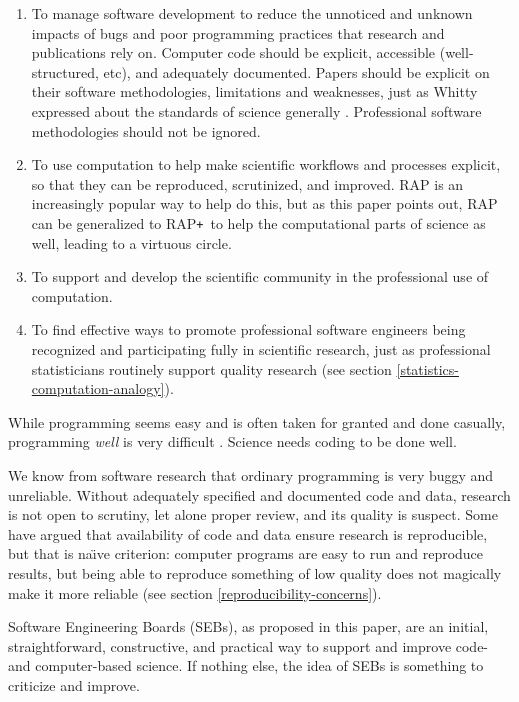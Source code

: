 \documentclass{comjnl}
\def\RAPstar{RAP{\tt +}}
\begin{document}
\begin{enumerate}\raggedright
\itemsep=1.5ex

\item 
To manage software development to reduce the unnoticed and unknown impacts of bugs and poor programming practices that research and publications rely on. Computer code should be explicit, accessible (well-structured, etc), and adequately documented. Papers should be explicit on their software methodologies, limitations and weaknesses, just as Whitty expressed about the standards of science generally \cite{whitty}. Professional software methodologies should not be ignored.

\item 
To use computation to help make scientific workflows and processes explicit, so that they can be reproduced, scrutinized, and improved. RAP is an increasingly popular way to help do this, but as this paper points out, RAP can be generalized to \RAPstar\ to help the computational parts of science as well, leading to a virtuous circle.

\item
To support and develop the scientific community in the professional use of computation.

\item
To find effective ways to promote professional software engineers being recognized and participating fully in scientific research, just as professional statisticians routinely support quality research (see section \ref{statistics-computation-analogy}).
\end{enumerate}

While programming seems easy and is often taken for granted and done casually, programming \emph{well\/} is very difficult \cite{fixit}. Science needs coding to be done well. 

We know from software research that ordinary programming is very buggy and unreliable. Without adequately specified and documented code and data, research is not open to scrutiny, let alone proper review, and its quality is suspect. Some have argued that availability of code and data ensure research is reproducible, but that is na\"\i ve criterion: computer programs are easy to run and reproduce results, but being able to reproduce something of low quality does not magically make it more reliable \cite{reproducibility,relit,popper-conjectures-refutations} (see section \ref{reproducibility-concerns}). 

Software Engineering Boards (SEBs), as proposed in this paper, are an initial, straightforward, constructive, and practical way to support and improve code- and computer-based science. If nothing else, the idea of SEBs is something to criticize and improve.
\end{document}
